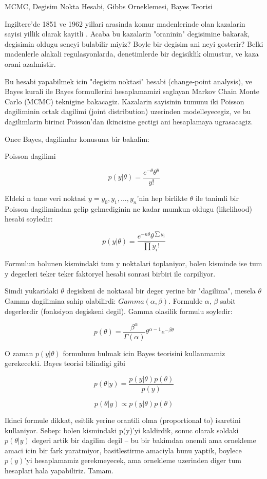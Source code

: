 \documentclass[12pt,fleqn]{article}\usepackage{../common}
\begin{document}
MCMC, Degisim Nokta Hesabi, Gibbs Orneklemesi, Bayes Teorisi

Ingiltere'de 1851 ve 1962 yillari arasinda komur madenlerinde olan
kazalarin sayisi yillik olarak kayitli . Acaba bu kazalarin
"oraninin" degisimine bakarak, degisimin oldugu seneyi bulabilir
miyiz? Boyle bir degisim ani neyi gosterir? Belki madenlerle alakali
regulasyonlarda, denetimlerde bir degisiklik olmustur, ve kaza orani
azalmistir.

Bu hesabi yapabilmek icin "degisim noktasi" hesabi (change-point
analysis), ve Bayes kurali ile Bayes formullerini hesaplamamizi
saglayan Markov Chain Monte Carlo (MCMC) teknigine
bakacagiz. Kazalarin sayisinin tumunu iki Poisson dagiliminin
ortak dagilimi (joint distribution) uzerinden modelleyecegiz, ve bu
dagilimlarin birinci Poisson'dan ikincisine gectigi ani hesaplamaya
ugrasacagiz.

Once Bayes, dagilimlar konusuna bir bakalim:

Poisson dagilimi

$$ p(y|\theta) = \frac{e^{-\theta}\theta^y}{y!} $$

Eldeki n tane veri noktasi $y=y_0, y_1,...,y_n$'nin hep birlikte
$\theta$ ile tanimli bir Poisson dagilimindan gelip gelmediginin ne
kadar mumkun oldugu (likelihood) hesabi soyledir:

$$ p(y|\theta) = \frac{e^{-n\theta}\theta^{\sum y_i}}{\prod y_i!}  $$

Formulun bolunen kismindaki tum y noktalari toplaniyor, bolen kisminde
ise tum y degerleri teker teker faktoryel hesabi sonrasi birbiri ile
carpiliyor.

Simdi yukaridaki $\theta$ degiskeni de noktasal bir deger yerine bir
"dagilima", mesela $\theta$ Gamma dagilimina sahip olabilirdi:
$Gamma(\alpha, \beta)$. Formulde $\alpha$, $\beta$ sabit degerlerdir
(fonksiyon degiskeni degil). Gamma olasilik formulu soyledir:

$$ p(\theta) = \frac{\beta^\alpha}{\Gamma(\alpha)}\theta^{\alpha-1}e^{-\beta\theta} $$

O zaman $p(y|\theta)$ formulunu bulmak icin Bayes teorisini
kullanmamiz gerekecekti. Bayes teorisi bilindigi gibi

$$ p(\theta|y) = \frac{p(y|\theta)p(\theta)}{p(y)} $$

$$ p(\theta|y) \propto p(y|\theta)p(\theta) $$

Ikinci formule dikkat, esitlik yerine orantili olma (proportional to)
isaretini kullaniyor. Sebep: bolen kismindaki p(y)'yi kaldirdik, sonuc
olarak soldaki $p(\theta|y)$ degeri artik bir dagilim degil -- bu bir
bakimdan onemli ama ornekleme amaci icin bir fark yaratmiyor,
basitlestirme amaciyla bunu yaptik, boylece $p(y)$'yi hesaplamamiz
gerekmeyecek, ama ornekleme uzerinden diger tum hesaplari hala
yapabiliriz. Tamam.
\end{document}
